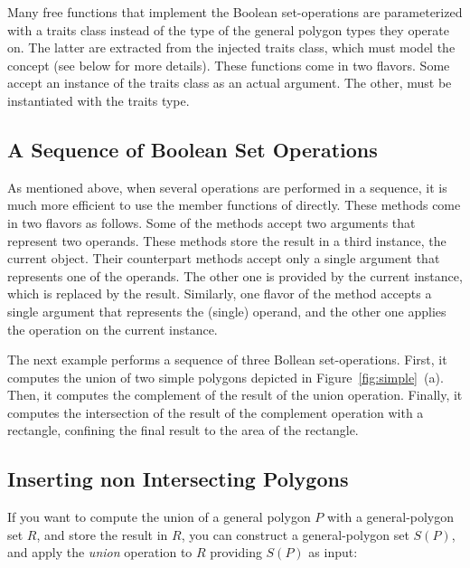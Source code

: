 Many free functions that implement the Boolean set-operations are
parameterized with a traits class instead of the type of the general
polygon types they operate on. The latter are extracted from the injected
traits class, which must model the concept 
 (see below for more details).
These functions come in two flavors. Some accept an instance of the traits 
class as an actual argument. The other, must be instantiated with the 
traits type.

\subsection{A Sequence of Boolean Set Operations}
\label{bobs_ssec:sequence}
As mentioned above, when several operations are performed in a 
sequence, it is much more efficient to use the member functions of
 directly.
These methods come in two flavors as follows. Some of the methods accept two
arguments that represent two operands. These methods store the result
in a third instance, the current object. Their counterpart methods
accept only a single argument that represents one of the operands.
The other one is provided by the current instance, which is replaced by
the result. Similarly, one flavor of the  method
accepts a single argument that represents the (single) operand, and the 
other one applies the operation on the current instance.

The next example performs a sequence of three Bollean set-operations.
First, it computes the union of two simple polygons depicted in
Figure~\ref{fig:simple}~(a). Then, it computes the complement of the result
of the union operation. Finally, it computes the intersection of the result
of the complement operation with a rectangle, confining the final result to 
the area of the rectangle.


\subsection{Inserting non Intersecting Polygons}
\label{bobs_ssec:insert}
If you want to compute the union of a general polygon $P$ with a
general-polygon set $R$, and store the result in $R$, you can construct
a general-polygon set $S(P)$, and apply the {\em union} operation to
$R$ providing $S(P)$ as input:

